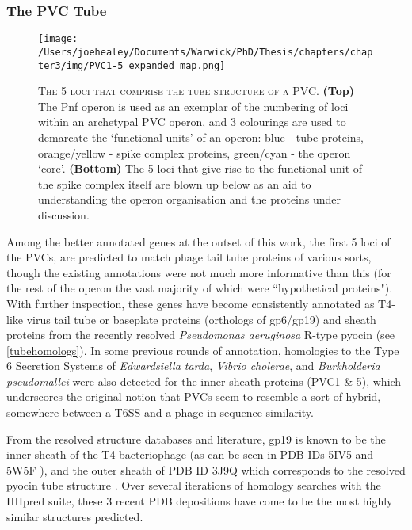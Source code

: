 \subsubsection{The PVC Tube}
\begin{figure}[h!]
\texttt{[image: /Users/joehealey/Documents/Warwick/PhD/Thesis/chapters/chapter3/img/PVC1-5\_expanded\_map.png]}
	\captionsetup{singlelinecheck=off, justification=justified, font=footnotesize, aboveskip=10pt}
	\caption[Tube protein region of a PVC operon]{\textsc{\normalsize The 5 loci that comprise the tube structure of a PVC.}\vspace{0.1cm} \newline \textbf{(Top)} The Pnf operon is used as an exemplar of the numbering of loci within an archetypal PVC operon, and 3 colourings are used to demarcate the `functional units' of an operon: blue - tube proteins, orange/yellow - spike complex proteins, green/cyan - the operon `core'. \textbf{(Bottom)} The 5 loci that give rise to the functional unit of the spike complex itself are blown up below as an aid to understanding the operon organisation and the proteins under discussion.}
	\label{PVC1-5map}
\end{figure}


Among the better annotated genes at the outset of this work, the first 5 loci of the PVCs, are predicted to match phage tail tube proteins of various sorts, though the existing annotations were not much more informative than this (for the rest of the operon the vast majority of which were ``hypothetical proteins"). With further inspection, these genes have become consistently annotated as T4-like virus tail tube or baseplate proteins (orthologs of gp6/gp19) and sheath proteins from the recently resolved \emph{Pseudomonas aeruginosa} R-type pyocin (see \vref{tubehomologs}). In some previous rounds of annotation, homologies to the Type 6 Secretion Systems of \emph{Edwardsiella tarda}, \emph{Vibrio cholerae}, and \emph{Burkholderia pseudomallei} were also detected for the inner sheath proteins (PVC1 \& 5), which underscores the original notion that PVCs seem to resemble a sort of hybrid, somewhere between a T6SS and a phage in sequence similarity.

From the resolved structure databases and literature, gp19 is known to be the inner sheath of the T4 bacteriophage (as can be seen in PDB IDs 5IV5 and 5W5F \citep{Taylor2016, Zheng2017}), and the outer sheath of PDB ID 3J9Q which corresponds to the resolved pyocin tube structure \citep{Ge2015}. Over several iterations of homology searches with the HHpred suite, these 3 recent PDB depositions have come to be the most highly similar structures predicted.

